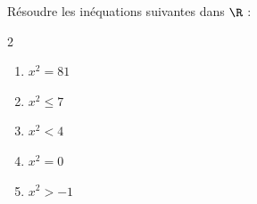 \begin{exo}{}
	Résoudre les inéquations suivantes dans $\R$ :
	\vspace*{-2mm}
	\begin{multicols}{2}
		\begin{enumerate}[itemsep=2mm]
			\item $x^2 = 81$
			\item $x^2 \le 7$
			\item $x^2 < 4$
			\item $x^2 = 0$
			\item $x^2 > -1$
		\end{enumerate}
	\end{multicols}\vspace*{-2mm}
\end{exo}
